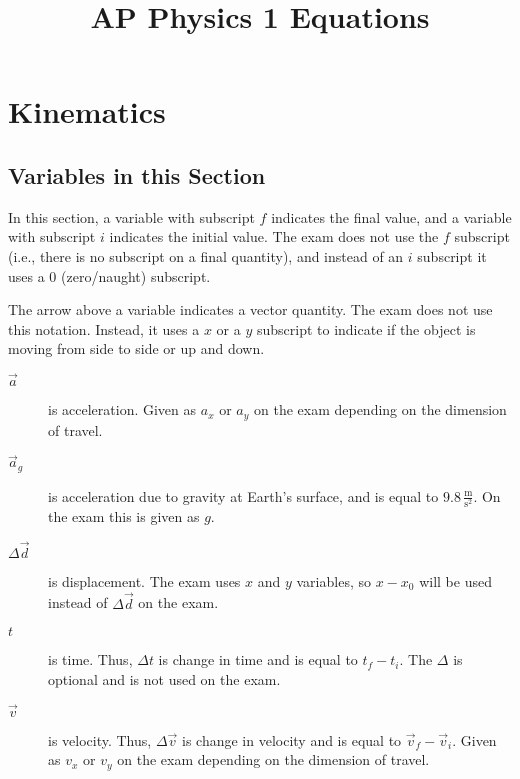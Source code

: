 \documentclass{article}[11pt]
\title{AP Physics 1 Equations}
\author{}
\date{}
\numberwithin{equation}{section}
\begin{document}
    \maketitle
    \tableofcontents

    \newpage
    \section{Kinematics}
        \subsection*{Variables in this Section}
            In this section, a variable with subscript $f$ indicates the final
            value, and a variable with subscript $i$ indicates the initial
            value. The exam does not use the $f$ subscript (i.e., there is no
            subscript on a final quantity), and instead of an $i$ subscript it
            uses a $0$ (zero/naught) subscript.

            The arrow above a variable indicates a vector quantity. The exam
            does not use this notation. Instead, it uses a $x$ or a $y$
            subscript to indicate if the object is moving from side to side or
            up and down.

            \begin{description}
                \item[$\vec{a}$] is acceleration. Given as $a_x$ or $a_y$ on
                the exam depending on the dimension of travel.
                \item[$\vec{a}_g$] is acceleration due to gravity at Earth's
                surface, and is equal to $9.8\, \frac{\text{m}}{\text{s}^2}$.
                On the exam this is given as $g$.
                \item[$\Delta \vec{d}$] is displacement. The exam uses $x$ and
                $y$ variables, so $x - x_0$ will be used instead of $\Delta
                \vec{d}$ on the exam.
                \item[$t$] is time. Thus, $\Delta t$ is change in time and is
                equal to $t_f - t_i$. The $\Delta$ is optional and is not used
                on the exam.
                \item[$\vec{v}$] is velocity. Thus, $\Delta \vec{v}$ is change
                in velocity and is equal to $\vec{v}_f - \vec{v}_i$. Given as
                $v_x$ or $v_y$ on the exam depending on the dimension of
                travel.
            \end{description}
\end{document}
